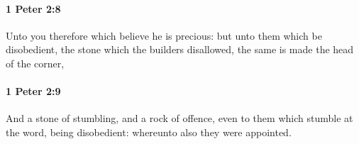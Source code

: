 		\paragraph{1 Peter 2:8} %
			\label{1PETER-2-8}

			Unto you therefore which believe he is precious: but unto them which be disobedient, the stone which the builders disallowed, the same is made the head of the corner,

			\begin{framed}
			\scriptsize
				\begin{compactdesc}
					\item[SBLG] 
				\end{compactdesc}
			\end{framed}

		\paragraph{1 Peter 2:9} %
			\label{1PETER-2-9}

			And a stone of stumbling, and a rock of offence, even to them which stumble at the word, being disobedient: whereunto also they were appointed.

